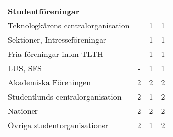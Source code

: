 \documentclass{dsekkallelse}
\begin{document}
\begin{table}[]
\begin{tabular}{@{}lccc@{}}
        \addlinespace
        \midrule
        \addlinespace
        \textbf{Studentföreningar}         &                               &                                                                                               &                                                                                   \\
        \addlinespace
        \cmidrule{1-1}
        Teknologkårens centralorganisation & -                             & 1                                                                                             & 1                                                                                 \\
        Sektioner, Intresseföreningar      & -                             & 1                                                                                             & 1                                                                                 \\
        Fria föreningar inom TLTH          & -                             & 1                                                                                             & 1                                                                                 \\
        LUS, SFS                           & -                             & 1                                                                                             & 1                                                                                 \\
        Akademiska Föreningen              & 2                             & 2                                                                                             & 2                                                                                 \\
        Studentlunds centralorganisation   & 2                             & 1                                                                                             & 2                                                                                 \\
        Nationer                           & 2                             & 2                                                                                             & 2                                                                                 \\
        Övriga studentorganisationer       & 2                             & 1                                                                                             & 2                                                                                 \\

\end{tabular}
\end{table}
\end{document}

